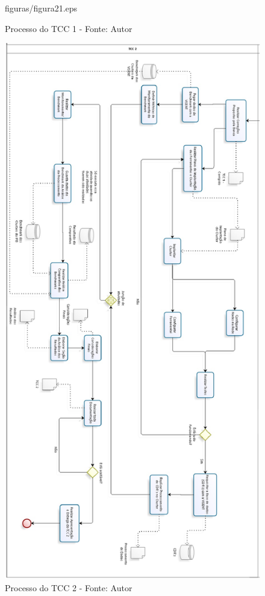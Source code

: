 \begin{figure}[ht!]
                                      {figuras/figura21.eps}
                \caption[Processo do TCC 1]{Processo do TCC 1 -
                \protect Fonte: Autor}
                \label{figura21}
        \end{figure}

        \begin{figure}[ht!]
        \centering
            \includegraphics[keepaspectratio=true,scale=0.5]
                                      {figuras/figura22.eps}
                \caption[Processo do TCC 2]{Processo do TCC 2 -
                \protect Fonte: Autor}
                \label{figura22}
        \end{figure}

